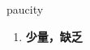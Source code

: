 
\begin{frame}
{\huge paucity}
\begin{center}
\begin{enumerate}\Large
  \item \textbf{少量，缺乏}
\end{enumerate}
\end{center}
\end{frame}
